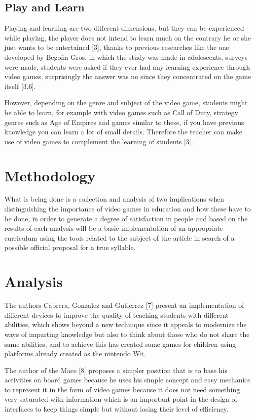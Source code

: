 \documentclass[conference, letterpaper]{IEEEtran}
\begin{document}
\subsection{Play and Learn}
Playing and learning are two different dimensions, but they can be experienced while playing, the player does not intend to learn much on the contrary he or she just wants to be entertained [3], thanks to previous researches like the one developed by Begoña Gros, in which the study was made in adolescents, surveys were made, students were asked if they ever had any learning experience through video games, surprisingly the answer was no since they concentrated on the game itself [3,6].

However, depending on the genre and subject of the video game, students might be able to learn, for example with video games such as Call of Duty, strategy genres such as Age of Empires and games similar to these, if you have previous knowledge you can learn a lot of small details. Therefore the teacher can make use of video games to complement the learning of students [3].

\section{Methodology}
What is being done is a collection and analysis of two implications when distinguishing the importance of video games in education and how these have to be done, in order to generate a degree of satisfaction in people and based on the results of each analysis will be a basic implementation of an appropriate curriculum using the tools related to the subject of the article in search of a possible official proposal for a true syllable. 

\section{Analysis}
The authors Cabrera, Gonzalez and Gutierrez [7] present an implementation of different devices to improve the quality of teaching students with different abilities, which shows beyond a new technique since it appeals to modernize the ways of imparting knowledge but also to think about those who do not share the same abilities, and to achieve this has created some games for children using platforms already created as the nintendo Wii.

The author of the Mace [8] proposes a simpler position that is to base his activities on board games because he uses his simple concept and easy mechanics to represent it in the form of video games because it does not need something very saturated with information which is an important point in the design of interfaces to keep things simple but without losing their level of efficiency.
\end{document}
